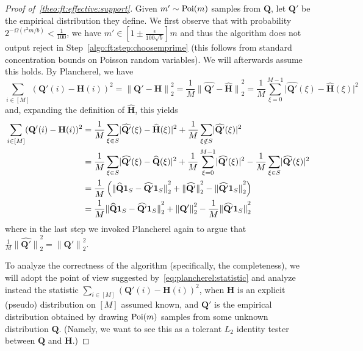 \documentclass[11pt]{article}
\theoremstyle{definition}
\newcommand{\q}{\mathbf{Q}}
\newcommand{\h}{\mathbf{H}}
\newcommand{\eps}{\epsilon}
\newcommand{\norm}[1]{\lVert#1\rVert}
\newcommand{\Poi}{\mathop{\textnormal{Poi}}\nolimits}
\newcommand{\normtwo}[1]{{\norm{#1}}_2}
\newcommand{\dabs}[1]{\lvert #1 \rvert}
\newcommand{\reject}{\textsf{reject}\xspace}
\newcommand{\fourier}[1]{\widehat{#1}}
\begin{document}
\begin{proof}[Proof of~\cref{theo:ft:effective:support}]
Given $m'\sim\Poi(m)$ samples from $\q$, let $\q'$ be the empirical distribution they define. 
We first observe that with probability $2^{-\Omega(\eps^2m/b)}< \frac{1}{100}$, we have $m' \in [1\pm \frac{\eps}{100\sqrt{b}}]m$ and thus the algorithm does not output \reject in Step~\ref{algo:ft:step:choosemprime} (this follows from standard concentration bounds on Poisson random variables). We will afterwards assume this holds. By Plancherel, we have
\[
  \sum_{i\in [M]} (\q'(i)-\h(i))^2 = \normtwo{\q'-\h}^2 =  \frac{1}{M}\normtwo{\fourier{\q'}-\fourier{\h}}^2 = \frac{1}{M}\sum_{\xi=0}^{M-1} \dabs{\fourier{\q'}(\xi)-\fourier{\h}(\xi)}^2
\]
and, expanding the definition of $\fourier{\h}$, this yields
\begin{align}
  \sum_{i\in [M]} (\q'(i)-\h(i))^2 &=  \frac{1}{M}\sum_{\xi\in S} \dabs{\fourier{\q'}(\xi)-\fourier{\h}(\xi)}^2 + \frac{1}{M}\sum_{\xi\notin S} \dabs{\fourier{\q'}(\xi)}^2 \notag\\
  &=  \frac{1}{M}\sum_{\xi\in S} \dabs{\fourier{\q'}(\xi)-\fourier{\q}(\xi)}^2 + \frac{1}{M}\sum_{\xi=0}^{M-1} \dabs{\fourier{\q'}(\xi)}^2 
  - \frac{1}{M}\sum_{\xi\in S} \dabs{\fourier{\q'}(\xi)}^2 \notag\\
  &=  \frac{1}{M}\left(\normtwo{\fourier{\q}\mathbf{1}_{S}-\fourier{\q'}\mathbf{1}_{S}}^2 + \normtwo{\fourier{\q'}}^2 - \normtwo{\fourier{\q'}\mathbf{1}_{S}}^2\right)  \notag\\
  &=  \frac{1}{M}\normtwo{\fourier{\q}\mathbf{1}_{S}-\fourier{\q'}\mathbf{1}_{S}}^2 + \normtwo{\q'}^2 - \frac{1}{M}\normtwo{\fourier{\q'}\mathbf{1}_{S}}^2  \label{eq:plancherel:statistic}
\end{align}
where in the last step we invoked  Plancherel again to argue that $\frac{1}{M}\normtwo{\fourier{\q'}}^2=\normtwo{\q'}^2$.

To analyze the correctness of the algorithm (specifically, the completeness), we will adopt the point of view suggested by~\eqref{eq:plancherel:statistic} and analyze instead the statistic
$\sum_{i\in [M]} (\q'(i)-\h(i))^2$, when $\h$ is an explicit (pseudo) distribution on $[M]$ assumed known, and $\q'$ is the empirical distribution obtained by drawing $\Poi(m)$ samples from some unknown distribution $\q$. (Namely, we want to see this as a tolerant $L_2$ identity tester between $\q$ and $\h$.)


\end{proof}
\end{document}
